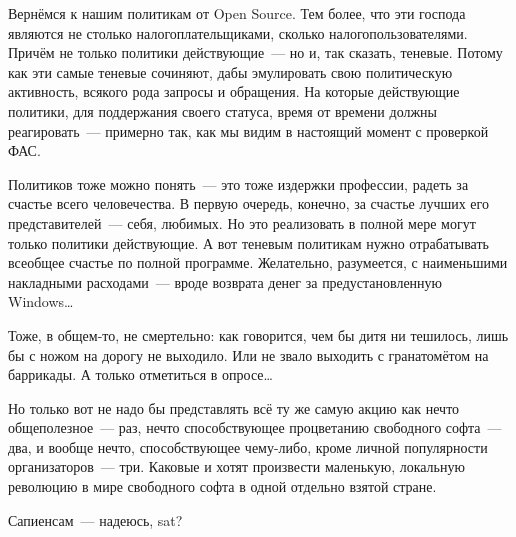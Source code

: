 Вернёмся к нашим политикам от Open Source. Тем более, что эти господа являются не столько налогоплательщиками, сколько налогопользователями. Причём не только политики действующие~--- но и, так сказать, теневые. Потому как эти самые теневые сочиняют, дабы эмулировать свою политическую активность, всякого рода запросы и обращения. На которые действующие политики, для поддержания своего статуса, время от времени должны реагировать~--- примерно так, как мы видим в настоящий момент с проверкой ФАС.

Политиков тоже можно понять~--- это тоже издержки профессии, радеть за счастье всего человечества. В первую очередь, конечно, за счастье лучших его представителей~--- себя, любимых. Но это реализовать в полной мере могут только политики действующие. А вот теневым политикам нужно отрабатывать всеобщее счастье по полной программе. Желательно, разумеется, с наименьшими накладными расходами~--- вроде возврата денег за предустановленную Windows\dots

Тоже, в общем-то, не смертельно: как говорится, чем бы дитя ни тешилось, лишь бы с ножом на дорогу не выходило. Или не звало выходить с гранатомётом на баррикады. А только отметиться в опросе\dots

Но только вот не надо бы представлять всё ту же самую акцию как нечто общеполезное~--- раз, нечто способствующее процветанию свободного софта~--- два, и вообще нечто, способствующее чему-либо, кроме личной популярности организаторов~--- три. Каковые и хотят произвести маленькую, локальную революцию в мире свободного софта в одной отдельно взятой стране.

Сапиенсам~--- надеюсь, sat?